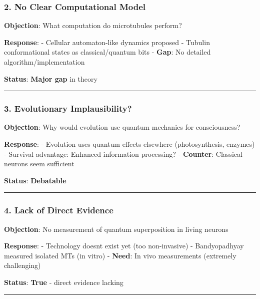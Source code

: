 \subsubsection{2. No Clear Computational
Model}\label{no-clear-computational-model}

\textbf{Objection}: What computation do microtubules perform?

\textbf{Response}: - Cellular automaton-like dynamics proposed - Tubulin
conformational states as classical/quantum bits - \textbf{Gap}: No
detailed algorithm/implementation

\textbf{Status}: \textbf{Major gap} in theory

\begin{center}\rule{0.5\linewidth}{0.5pt}\end{center}

\subsubsection{3. Evolutionary
Implausibility?}\label{evolutionary-implausibility}

\textbf{Objection}: Why would evolution use quantum mechanics for
consciousness?

\textbf{Response}: - Evolution uses quantum effects elsewhere
(photosynthesis, enzymes) - Survival advantage: Enhanced information
processing? - \textbf{Counter}: Classical neurons seem sufficient

\textbf{Status}: \textbf{Debatable}

\begin{center}\rule{0.5\linewidth}{0.5pt}\end{center}

\subsubsection{4. Lack of Direct
Evidence}\label{lack-of-direct-evidence}

\textbf{Objection}: No measurement of quantum superposition in living
neurons

\textbf{Response}: - Technology doesn\textquotesingle t exist yet (too
non-invasive) - Bandyopadhyay measured isolated MTs (in vitro) -
\textbf{Need}: In vivo measurements (extremely challenging)

\textbf{Status}: \textbf{True} - direct evidence lacking

\begin{center}\rule{0.5\linewidth}{0.5pt}\end{center}

